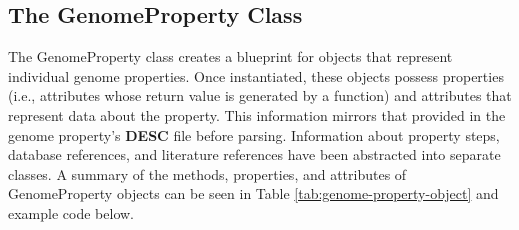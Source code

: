 \subsection{The GenomeProperty Class} \label{genome-property-class}

The GenomeProperty class creates a blueprint for objects that represent individual genome properties. Once instantiated, these objects possess properties (i.e., attributes whose return value is generated by a function) and attributes that represent data about the property. This information mirrors that provided in the genome property's \textbf{DESC} file before parsing. Information about property steps, database references, and literature references have been abstracted into separate classes. A summary of the methods, properties, and attributes of GenomeProperty objects can be seen in Table \ref{tab:genome-property-object} and example code below.

